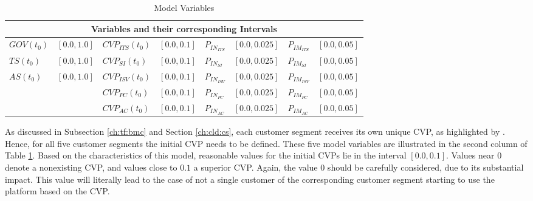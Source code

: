 \begin{table}[t]
	\centering
	\begin{tabular}{llllllll}
		\toprule 
		\multicolumn{8}{c}{\footnotesize \textbf{Variables and their corresponding Intervals}} \\ \midrule
		\footnotesize $GOV(t_0)$ & \footnotesize $[0.0,1.0]$ & \footnotesize $CVP_{ITS}(t_0)$ & \footnotesize $[0.0,0.1]$ & \footnotesize $P_{IN_{ITS}}$ & \footnotesize $[0.0,0.025]$ & \footnotesize $P_{IM_{ITS}}$ & \footnotesize $[0.0,0.05]$ \\
		\footnotesize $TS(t_0)$ & \footnotesize $[0.0,1.0]$ & \footnotesize $CVP_{SI}(t_0)$ & \footnotesize $[0.0,0.1]$ & \footnotesize $P_{IN_{SI}}$ & \footnotesize $[0.0,0.025]$ & \footnotesize $P_{IM_{SI}}$ & \footnotesize $[0.0,0.05]$ \\
		\footnotesize $AS(t_0)$ & \footnotesize $[0.0,1.0]$ & \footnotesize $CVP_{ISV}(t_0)$ & \footnotesize $[0.0,0.1]$ & \footnotesize $P_{IN_{ISV}}$ & \footnotesize $[0.0,0.025]$ & \footnotesize $P_{IM_{ISV}}$ & \footnotesize $[0.0,0.05]$ \\
		& & \footnotesize $CVP_{PC}(t_0)$ & \footnotesize $[0.0,0.1]$ & \footnotesize $P_{IN_{PC}}$ & \footnotesize $[0.0,0.025]$ & \footnotesize $P_{IM_{PC}}$ & \footnotesize $[0.0,0.05]$ \\
		& & \footnotesize $CVP_{AC}(t_0)$ & \footnotesize $[0.0,0.1]$ & \footnotesize $P_{IN_{AC}}$ & \footnotesize $[0.0,0.025]$ & \footnotesize $P_{IM_{AC}}$ & \footnotesize $[0.0,0.05]$ \\ \bottomrule
	\end{tabular}
	\caption{Model Variables}
	\label{tab:mvar}
\end{table}

\setlength{\tabcolsep}{\originalTabcolsep}

As discussed in Subsection \ref{ch:tf:bmc} and Section \ref{ch:cld:cs}, each customer segment receives its own unique \ac{CVP}, as highlighted by \citet{Johnson2008}. Hence, for all five customer segments the initial \ac{CVP} needs to be defined. These five model variables are illustrated in the second column of Table \ref{tab:mvar}. Based on the characteristics of this model, reasonable values for the initial \acp{CVP} lie in the interval $[0.0,0.1]$. Values near $0$ denote a nonexisting \ac{CVP}, and values close to $0.1$ a superior \ac{CVP}. Again, the value $0$ should be carefully considered, due to its substantial impact. This value will literally lead to the case of not a single customer of the corresponding customer segment starting to use the platform based on the \ac{CVP}.

